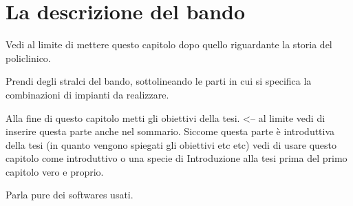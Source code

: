 \chapter{La descrizione del bando}
\thispagestyle{empty}
Vedi al limite di mettere questo capitolo dopo quello riguardante la storia del policlinico.

Prendi degli stralci del bando, sottolineando le parti in cui si specifica la combinazioni di impianti da realizzare. 

Alla fine di questo capitolo metti gli obiettivi della tesi. <-- al limite vedi di inserire questa parte anche nel sommario. Siccome questa parte è introduttiva della tesi (in quanto vengono spiegati gli obiettivi etc etc) vedi di usare questo capitolo come introduttivo o una specie di Introduzione alla tesi prima del primo capitolo vero e proprio.

Parla pure dei softwares usati.
